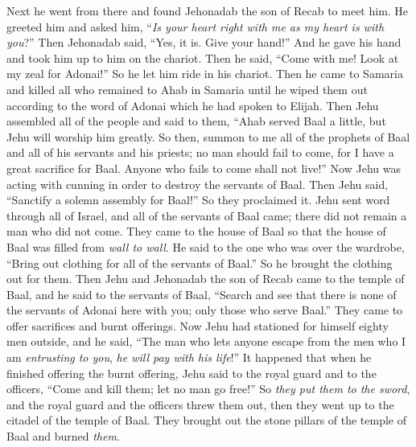 \begin{biblechapter}
\verse Next he went from there and found Jehonadab the son of Recab to meet him. He greeted him and asked him, “\textit{Is your heart right with me as my heart is with you}?” Then Jehonadab said, “Yes, it is. Give your hand!” And he gave his hand and took him up to him on the chariot.
\verse Then he said, “Come with me! Look at my zeal for Adonai!” So he let him ride in his chariot.
\verse Then he came to Samaria and killed all who remained to Ahab in Samaria until he wiped them out according to the word of Adonai which he had spoken to Elijah.
 Then Jehu assembled all of the people and said to them, “Ahab served Baal a little, but Jehu will worship him greatly.
\verse So then, summon to me all of the prophets of Baal and all of his servants and his priests; no man should fail to come, for I have a great sacrifice for Baal. Anyone who fails to come shall not live!” Now Jehu was acting with cunning in order to destroy the servants of Baal.
\verse Then Jehu said, “Sanctify a solemn assembly for Baal!” So they proclaimed it.
\verse Jehu sent word through all of Israel, and all of the servants of Baal came; there did not remain a man who did not come. They came to the house of Baal so that the house of Baal was filled from \textit{wall to wall}.
\verse He said to the one who was over the wardrobe, “Bring out clothing for all of the servants of Baal.” So he brought the clothing out for them.
\verse Then Jehu and Jehonadab the son of Recab came to the temple of Baal, and he said to the servants of Baal, “Search and see that there is none of the servants of Adonai here with you; only those who serve Baal.”
\verse They came to offer sacrifices and burnt offerings. Now Jehu had stationed for himself eighty men outside, and he said, “The man who lets anyone escape from the men who I am \textit{entrusting to you}, \textit{he will pay with his life}!”
\verse It happened that when he finished offering the burnt offering, Jehu said to the royal guard and to the officers, “Come and kill them; let no man go free!” So \textit{they put them to the sword}, and the royal guard and the officers threw them out, then they went up to the citadel of the temple of Baal.
\verse They brought out the stone pillars of the temple of Baal and burned \textit{them}.

\end{biblechapter}
